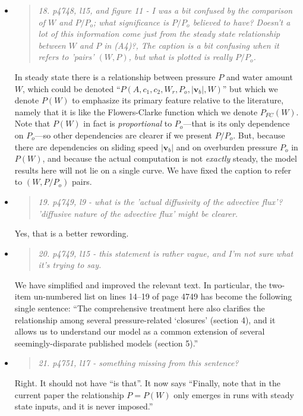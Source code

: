 \documentclass[11pt,reqno]{amsart}
\newcommand{\reply}[2]{
\medskip\medskip
\item  \begin{quote}
\emph{#1}
\end{quote}

\medskip
\noindent #2}
\begin{document}
\begin{itemize}
\reply{18. p4748, l15, and figure 11 - I was a bit confused by the comparison of $W$ and $P/P_o$; what significance is $P/P_o$ believed to have? Doesn't a lot of this information come just from the steady state relationship between $W$ and $P$ in (A4)?, The caption is a bit confusing when it refers to 'pairs' $(W,P)$, but what is plotted is really $P/P_o$.}
{In steady state there is a relationship between pressure $P$ and water amount $W$, which could be denoted ``$P(A,c_1,c_2,W_r,P_o,|\mathbf{v}_b|,W)$'' but which we denote $P(W)$ to emphasize its primary feature relative to the literature, namely that it is like the Flowers-Clarke function which we denote $P_{FC}(W)$.  Note that $P(W)$ in fact is \emph{proportional} to $P_o$---that is its only dependence on $P_o$---so other dependencies are clearer if we present $P/P_o$.  But, because there are dependencies on sliding speed $|\mathbf{v}_b|$ and on overburden pressure $P_o$ in $P(W)$, and because the actual computation is not \emph{exactly} steady, the model results here will not lie on a single curve.  We have fixed the caption to refer to $(W,P/P_o)$ pairs.}

\reply{19. p4749, l9 - what is the 'actual diffusivity of the advective flux'?  'diffusive nature of the advective flux' might be clearer.}
{Yes, that is a better rewording.}

\reply{20. p4749, l15 - this statement is rather vague, and I'm not sure what it's trying to say.}
{We have simplified and improved the relevant text.  In particular, the two-item un-numbered list on lines 14--19 of page 4749 has become the following single sentence: ``The comprehensive treatment here also clarifies the relationship among several pressure-related `closures' (section 4), and it allows us to understand our model as a common extension of several seemingly-disparate published models (section 5).''}

\reply{21. p4751, l17 - something missing from this sentence?}
{Right.  It should not have ``is that''.  It now says ``Finally, note that in the current paper the relationship $P = P(W)$ only emerges in runs with steady state inputs, and it is never imposed.''}
\end{itemize}
\end{document}
